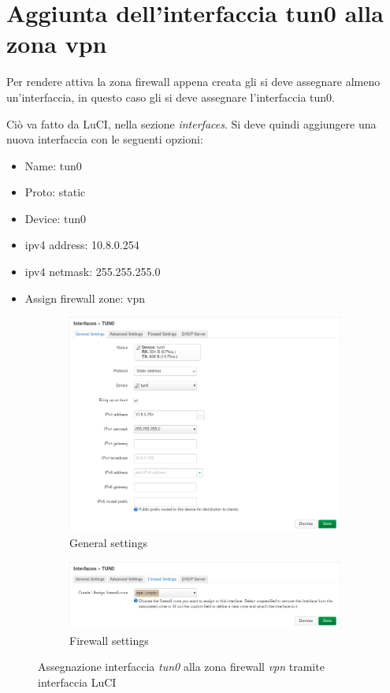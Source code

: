 \section{Aggiunta dell'interfaccia tun0 alla zona vpn}

Per rendere attiva la zona firewall appena creata gli si deve assegnare almeno un'interfaccia, in questo caso gli si deve assegnare l'interfaccia tun0.

Ciò va fatto da LuCI, nella sezione \textit{interfaces}. Si deve quindi aggiungere una nuova interfaccia con le seguenti opzioni:
\begin{itemize}
    \item Name: tun0
    \item Proto: static
    \item Device: tun0
    \item ipv4 address: 10.8.0.254
    \item ipv4 netmask: 255.255.255.0
    \item Assign firewall zone: vpn
\end{itemize}

\begin{figure}[H]
    \centering
    \begin{subfigure}{0.9\linewidth}
        \centering
        \includegraphics[width=0.9\linewidth]{immagini/LuCI_int_tun0_1}
        \caption{General settings}
        \label{fig:luci-firewall-interfaces}
    \end{subfigure}
    \medskip

    \begin{subfigure}{0.9\linewidth}
        \centering
        \includegraphics[width=0.9\linewidth]{immagini/LuCI_int_tun0_2}
        \caption{Firewall settings}
        \label{fig:luci-firewall-interfaces1}
    \end{subfigure}
    \caption{Assegnazione interfaccia \textit{tun0} alla zona firewall \textit{vpn} tramite interfaccia LuCI}
\end{figure}


